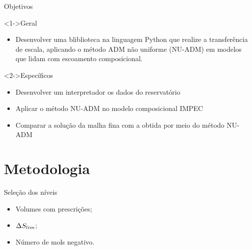\documentclass[professionalfont]{beamer}
\begin{document}
\begin{frame}{Objetivos}

    \begin{block}<1->{Geral}
        \begin{itemize}
            \item Desenvolver uma bliblioteca na linguagem Python que realize a transferência de escala, aplicando o método ADM não uniforme (NU-ADM) em modelos que lidam com escoamento composicional.
        \end{itemize}
    \end{block}

    \begin{block}<2->{Específicos}
        \begin{itemize}
            \item Desenvolver um interpretador os dados do reservatório
            \item Aplicar o método NU-ADM no modelo composicional IMPEC
            \item Comparar a solução da malha fina com a obtida por meio do método NU-ADM
        \end{itemize}
    \end{block}
    
\end{frame}

\section{Metodologia}
\begin{frame}{Seleção dos níveis}
    \small
    \begin{itemize}
        \justifying
        \item Volumes com prescrições;
        \item $\Delta S_{lim}$;
        \item Número de mols negativo.
    \end{itemize}
\end{frame}
\end{document}
